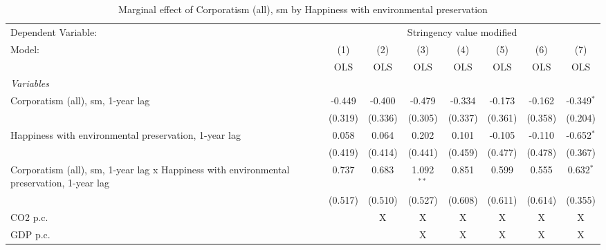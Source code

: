 
\begin{table}[htbp]
   \caption{Marginal effect of Corporatism (all), sm by Happiness with environmental preservation}
   \centering
   \begin{tabular}{lccccccc}
      \toprule
      Dependent Variable: & \multicolumn{7}{c}{Stringency value modified}\\
      Model:                                                                                    & (1)     & (2)     & (3)          & (4)     & (5)     & (6)     & (7)\\  
                                                                                                &  OLS    & OLS     & OLS          & OLS     & OLS     & OLS     & OLS\\  
      \midrule
      \emph{Variables}\\
      Corporatism (all), sm, 1-year lag                                                         & -0.449  & -0.400  & -0.479       & -0.334  & -0.173  & -0.162  & -0.349$^{*}$\\   
                                                                                                & (0.319) & (0.336) & (0.305)      & (0.337) & (0.361) & (0.358) & (0.204)\\   
      Happiness with environmental preservation, 1-year lag                                     & 0.058   & 0.064   & 0.202        & 0.101   & -0.105  & -0.110  & -0.652$^{*}$\\   
                                                                                                & (0.419) & (0.414) & (0.441)      & (0.459) & (0.477) & (0.478) & (0.367)\\   
      Corporatism (all), sm, 1-year lag x Happiness with environmental preservation, 1-year lag & 0.737   & 0.683   & 1.092$^{**}$ & 0.851   & 0.599   & 0.555   & 0.632$^{*}$\\   
                                                                                                & (0.517) & (0.510) & (0.527)      & (0.608) & (0.611) & (0.614) & (0.355)\\   
      CO2 p.c.                                                                                  &         & X       & X            & X       & X       & X       & X\\  
      GDP p.c.                                                                                  &         &         & X            & X       & X       & X       & X\\  

\end{tabular}
\end{table}

